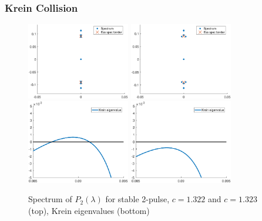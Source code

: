\documentclass[16pt]{beamer}
\begin{document}
\begin{frame}
\frametitle{Krein Collision}

\begin{figure}
\begin{center}
\includegraphics[width=4.5cm]{images/spec1322_double2.eps}
\includegraphics[width=4.5cm]{images/spec1323_double2.eps}
\includegraphics[width=4.5cm]{images/kreineigbefore.eps}
\includegraphics[width=4.5cm]{images/kreineigafter.eps}
\caption{Spectrum of $P_2(\lambda)$ for stable 2-pulse, $c = 1.322$ and $c=1.323$ (top), Krein eigenvalues (bottom)}
\end{center}
\end{figure}

\end{frame}
\end{document}
